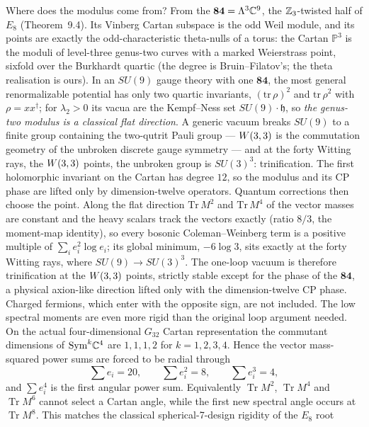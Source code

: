 Where does the modulus come from? From the $\mathbf{84}=\Lambda^3\mathbb{C}^9$, the $\mathbb{Z}_3$-twisted half of $E_8$
(Theorem~9.4). Its Vinberg Cartan subspace is the odd Weil module, and its points are exactly the odd-characteristic
theta-nulls of a torus: the Cartan $\mathbb P^3$ is the moduli of level-three genus-two curves with a marked Weierstrass
point, sixfold over the Burkhardt quartic (the degree is Bruin--Filatov's; the theta realisation is ours). In an
$SU(9)$ gauge theory with one $\mathbf{84}$, the most general renormalizable potential has only two quartic invariants,
$(\mathrm{tr}\,\rho)^2$ and $\mathrm{tr}\,\rho^2$ with $\rho=xx^\dagger$; for $\lambda_2>0$ its vacua are the Kempf--Ness
set $SU(9)\cdot\mathfrak h$, so \emph{the genus-two modulus is a classical flat direction}. A generic vacuum breaks
$SU(9)$ to a finite group containing the two-qutrit Pauli group --- $W(3,3)$ is the commutation geometry of the unbroken
discrete gauge symmetry --- and at the forty Witting rays, the $W(3,3)$ points, the unbroken group is $SU(3)^3$:
trinification. The first holomorphic invariant on the Cartan has degree $12$, so the modulus and its CP phase are lifted
only by dimension-twelve operators. 
Quantum corrections then choose the point. Along the flat direction $\mathrm{Tr}\,M^2$ and $\mathrm{Tr}\,M^4$ of the
vector masses are constant and the heavy scalars track the vectors exactly (ratio $8/3$, the moment-map identity), so
every bosonic Coleman--Weinberg term is a positive multiple of $\sum_i e_i^2\log e_i$; its global minimum,
$-6\log3$, sits exactly at the forty Witting rays, where $SU(9)\to SU(3)^3$. The one-loop vacuum is therefore
trinification at the $W(3,3)$ points, strictly stable except for the phase of the $\mathbf{84}$, a physical axion-like
direction lifted only with the dimension-twelve CP phase. Charged fermions, which enter with the opposite sign, are not
included. 
The low spectral moments are even more rigid than the original loop argument needed.  On the actual four-dimensional
$G_{32}$ Cartan representation the commutant dimensions of $\mathrm{Sym}^k\mathbb{C}^4$ are $1,1,1,2$ for
$k=1,2,3,4$.  Hence the vector mass-squared power sums are forced to be radial through
\[
 \sum e_i=20,\qquad \sum e_i^2=8,\qquad \sum e_i^3=4,
\]
and $\sum e_i^4$ is the first angular power sum.  Equivalently $\operatorname{Tr}M^2$,
$\operatorname{Tr}M^4$ and $\operatorname{Tr}M^6$ cannot select a Cartan angle, while the first new spectral
angle occurs at $\operatorname{Tr}M^8$.  This matches the classical spherical-7-design rigidity of the $E_8$ root
